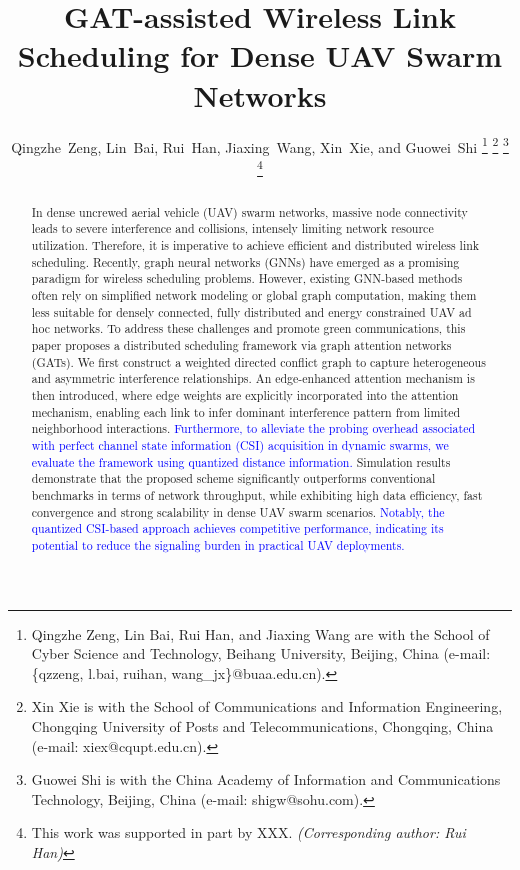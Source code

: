 \documentclass[journal]{IEEEtran}
\begin{document}
	
	\title{GAT-assisted Wireless Link Scheduling for Dense UAV Swarm Networks}
	
	\author{Qingzhe~Zeng, Lin~Bai, Rui~Han, Jiaxing~Wang, Xin~Xie, and Guowei~Shi
		\thanks{Qingzhe Zeng, Lin Bai, Rui Han, and Jiaxing Wang are with the School of Cyber Science and Technology, Beihang University, Beijing, China (e-mail: \{qzzeng, l.bai, ruihan, wang\_jx\}@buaa.edu.cn).}
		\thanks{Xin Xie is with the School of Communications and Information Engineering, Chongqing University of Posts and Telecommunications, Chongqing, China (e-mail: xiex@cqupt.edu.cn).}
		\thanks{Guowei Shi is with the China Academy of Information and Communications Technology, Beijing, China (e-mail: shigw@sohu.com).}
		\thanks{This work was supported in part by XXX. \textit{(Corresponding author: Rui Han)}}}
	
	\maketitle
	
	\begin{abstract}
		In dense uncrewed aerial vehicle (UAV) swarm networks, massive node connectivity leads to severe interference and collisions, intensely limiting network resource utilization. Therefore, it is imperative to achieve efficient and distributed wireless link scheduling. Recently, graph neural networks (GNNs) have emerged as a promising paradigm for wireless scheduling problems. However, existing GNN-based methods often rely on simplified network modeling or global graph computation, making them less suitable for densely connected, fully distributed and energy constrained UAV ad hoc networks. To address these challenges and promote green communications, this paper proposes a distributed scheduling framework via graph attention networks (GATs). We first construct a weighted directed conflict graph to capture heterogeneous and asymmetric interference relationships. An edge-enhanced attention mechanism is then introduced, where edge weights are explicitly incorporated into the attention mechanism, enabling each link to infer dominant interference pattern from limited neighborhood interactions. \textcolor{blue}{Furthermore, to alleviate the probing overhead associated with perfect channel state information (CSI) acquisition in dynamic swarms, we evaluate the framework using quantized distance information.} Simulation results demonstrate that the proposed scheme significantly outperforms conventional benchmarks in terms of network throughput, while exhibiting high data efficiency, fast convergence and strong scalability in dense UAV swarm scenarios. \textcolor{blue}{Notably, the quantized CSI-based approach achieves competitive performance, indicating its potential to reduce the signaling burden in practical UAV deployments.}
	\end{abstract}
	
\end{document}
